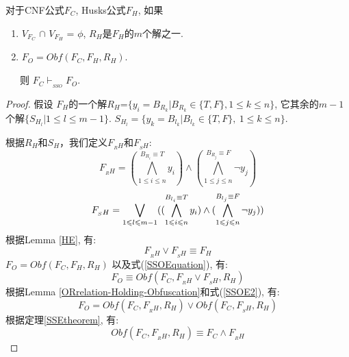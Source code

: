 对于CNF公式$F_C$, Husks公式$F_H$, 如果
\begin{enumerate}
 \item $V_{F_C}$ $\cap$ $V_{F_H}$ = $\phi$, $R_H$是$F_H$的$m$个解之一.
 \item $F_O=Obf(F_C,F_H,R_H)$.
\end{enumerate}
~~~则 $F_C \vdash_{_{SSO}} F_O$.
\begin{proof}

假设
        $F_H$的一个解$R_H$=$\{y_i=B_{R_k}|B_{R_k} \in \{T,F\}, 1\leqslant k\leqslant n\}$,
        它其余的$m-1$个解$\{S_{H_l} | 1\leqslant l\leqslant m-1\}$.
        $S_{H_l}=\{y_k=B_{l_k}|B_{l_k}\in \{ T,F \},~1\leqslant k\leqslant n\}$.

        根据$R_H$和$S_H$，我们定义$F_{_RH}$和$F_{_SH}$:
        \begin{equation}\label{SSORH}
        F_{_RH}=
        (\bigwedge_{1\leqslant i\leqslant n}^{B_{R_i}\equiv T}y_i)\wedge
        (\bigwedge_{1\leqslant j\leqslant n}^{B_{R_j}\equiv F}\neg y_j)
        \end{equation}
        \begin{equation}\label{SSOSH}
         F_{_SH}=\bigvee_{1\leqslant l\leqslant m-1}(
        (\bigwedge_{1\leqslant i\leqslant n}^{B_{l_i}\equiv T}y_i)\wedge
        (\bigwedge_{1\leqslant j\leqslant n}^{B_{l_j}\equiv F}\neg y_j))   \\
	  \end{equation}
根据Lemma \ref{HE}, 有:\\
        \begin{equation}\label{SSOEquation}
        F_{_RH}\vee F_{_SH}\equiv F_H
        \end{equation}
$F_O=Obf(F_C,F_H,R_H)$ 以及式(\ref{SSOEquation}), 有:\\
        \begin{equation}\label{SSOE2}
	F_O \equiv Obf(F_C,F_{_RH}\vee F_{_SH},R_H)
        \end{equation}
根据Lemma \ref{ORrelation-Holding-Obfuscation}和式(\ref{SSOE2}), 有:\\
        \begin{equation}\label{SSOE3}
	  F_O=Obf(F_C,F_{_RH},R_H) \vee Obf(F_C,F_{_SH},R_H)
	\end{equation}
根据定理\ref{SSEtheorem}, 有:\\
	\begin{equation}\label{SSOE4}
	  Obf(F_C,F_{_RH},R_H)\equiv F_C\wedge F_{_RH}
        \end{equation}

\end{proof}
